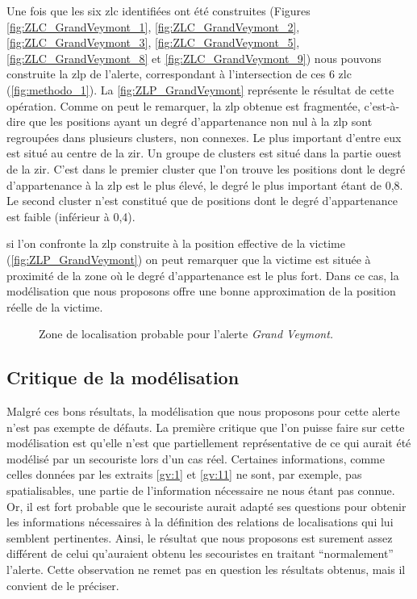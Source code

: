 Une fois que les six \ac{zlc} identifiées ont été construites (Figures
\ref{fig:ZLC_GrandVeymont_1}, \ref{fig:ZLC_GrandVeymont_2},
\ref{fig:ZLC_GrandVeymont_3}, \ref{fig:ZLC_GrandVeymont_5},
\ref{fig:ZLC_GrandVeymont_8} et \ref{fig:ZLC_GrandVeymont_9}) nous
pouvons construite la \ac{zlp} de l'alerte, correspondant à
l'intersection de ces 6 \ac{zlc} (\autoref{fig:methodo_1}). La
\autoref{fig:ZLP_GrandVeymont} représente le résultat de cette
opération. Comme on peut le remarquer, la \ac{zlp} obtenue est
fragmentée, c'est-à-dire que les positions ayant un degré
d'appartenance non nul à la \ac{zlp} sont regroupées dans plusieurs
clusters, non connexes. Le plus important d'entre eux est situé au
centre de la \ac{zir}. Un groupe de clusters est situé dans la partie
ouest de la \ac{zir}. C'est dans le premier cluster que l'on trouve
les positions dont le degré d'appartenance à la \ac{zlp} est le plus
élevé, le degré le plus important étant de 0,8. Le second cluster
n'est constitué que de positions dont le degré d'appartenance est
faible (inférieur à 0,4). 

si l'on confronte la \ac{zlp} construite à la position effective de la
victime (\autoref{fig:ZLP_GrandVeymont}) on peut remarquer que la
victime est située à proximité de la zone où le degré d'appartenance
est le plus fort. Dans ce cas, la modélisation que nous proposons
offre une bonne approximation de la position réelle de la victime.

\begin{figure}
  \centering
  
  \caption{Zone de localisation probable pour l'alerte \emph{Grand
      Veymont.}}
  \label{fig:ZLP_GrandVeymont}
\end{figure}


\subsection{Critique de la modélisation}
\label{subsec:9-2-3}

Malgré ces bons résultats, la modélisation que nous proposons pour
cette alerte n'est pas exempte de défauts. La première critique que
l'on puisse faire sur cette modélisation est qu'elle n'est que
partiellement représentative de ce qui aurait été modélisé par un
secouriste lors d'un cas réel. Certaines informations, comme celles
données par les extraits \ref{gv:1} et \ref{gv:11} ne sont, par
exemple, pas spatialisables, une partie de l'information nécessaire ne
nous étant pas connue. Or, il est fort probable que le secouriste
aurait adapté ses questions pour obtenir les informations nécessaires
à la définition des relations de localisations qui lui semblent
pertinentes. Ainsi, le résultat que nous proposons est surement assez
différent de celui qu'auraient obtenu les secouristes en traitant
\enquote{normalement} l'alerte. Cette observation ne remet pas en
question les résultats obtenus, mais il convient de le préciser.


